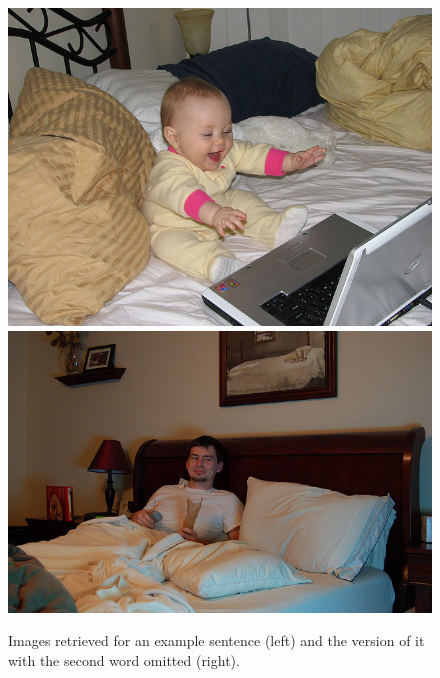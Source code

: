 \begin{figure}[t]
  \centering
  \includegraphics[scale=0.25]{85826.jpg}
  \includegraphics[scale=0.25]{60596.jpg}
  \caption{Images retrieved for an example sentence (left) and the version of
    it with the  second word omitted (right).}
  \label{fig:omissionexpic}
\end{figure}





 

